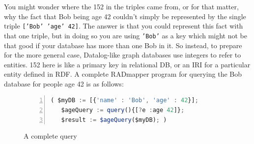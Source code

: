 \documentclass[9pt,letterpaper]{article}
\newcommand{\stt}[1]{\texttt{#1}} %
\begin{document}
You might wonder where the 152 in the triples came from, or for that matter, why the fact that Bob being age 42 couldn't
simply be represented by the single triple \stt{['Bob' 'age' 42]}.
The answer is that you could represent this fact with that one triple, but in doing so you are using \stt{'Bob'} as a key
which might not be that good if your database has more than one Bob in it.
So instead, to prepare for the more general case, Datalog-like graph databases use integers to refer to entities.
152 here is like a primary key in relational DB, or an IRI for a particular entity defined in RDF.
A complete RADmapper program for querying the Bob database for people age 42 is as follows:

\begin{figure}[H]
  \caption{A complete query}
  \label{code:bob-age}
\begin{lstlisting}[language=JavaScript,numberstyle=\scriptsize,basicstyle=\ttfamily\scriptsize,numbers=left,stepnumber=1,breaklines=true]
 ( $myDB := [{'name' : 'Bob', 'age' : 42}];
   $ageQuery := query(){[?e :age 42]};
   $result := $ageQuery($myDB); )
\end{lstlisting}
\end{figure} \vspace{-2em}

\end{document}
